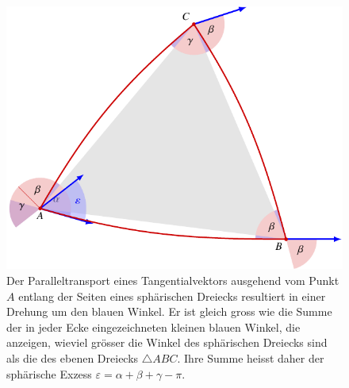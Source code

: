 %
%
%
\begin{figure}
\centering
\includegraphics{chapters/110-kruemmung/images/drehung.pdf}
\caption{Der Paralleltransport eines
Tangentialvektors ausgehend vom Punkt $A$ entlang der Seiten eines
sphärischen Dreiecks resultiert in einer Drehung um den blauen Winkel.
Er ist gleich gross wie die Summe der in jeder Ecke eingezeichneten
kleinen blauen Winkel, die anzeigen, wieviel grösser die Winkel
des sphärischen Dreiecks sind als die des ebenen Dreiecks
$\triangle ABC$.
Ihre Summe heisst daher der sphärische Exzess
$\varepsilon = \alpha+\beta+\gamma-\pi$.
\label{buch:kruemmung:fig:drehung}}
\end{figure}
